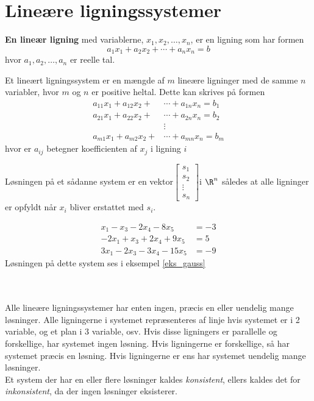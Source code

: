 \section{Lineære ligningssystemer }
%

\textbf{En lineær ligning} med variablerne, $x_1,x_2,\ldots ,x_n$, er en ligning som har formen
$$ a_1x_1+a_2x_2+\cdots+a_nx_n=b$$ 
hvor $a_1,a_2,\ldots,a_n$ er reelle tal. 

\begin{defn}{}{}
Et lineært ligningssystem er en mængde af $m$ lineære ligninger  med de samme $n$ variabler, hvor $m$ og $n$ er positive heltal.
Dette kan skrives på formen
\begin{align*}
a_{11}x_1+a_{12}x_2+&\cdots+a_{1n}x_n=b_1\\
a_{21}x_1+a_{22}x_2+&\cdots+a_{2n}x_n=b_2\\
&\vdots\\
a_{m1}x_1+a_{m2}x_2+&\cdots +a_{mn}x_n=b_m
\end{align*}
hvor er $a_{ij}$ betegner koefficienten af $x_j$ i ligning $i$
\end{defn}
\noindent
Løsningen på et sådanne system er en vektor$\begin{bmatrix}
s_1\\
s_2\\
\vdots\\
s_n
\end{bmatrix}
$i $\R ^n$ således at alle ligninger er opfyldt når $x_i$ bliver erstattet med $s_i$.
\begin{eks}\label{eks}
\begin{align*}
x_1-x_3-2x_4-8x_5&=-3 \\
-2x_1+x_3+2x_4+9x_5&=5 \\
3x_1-2x_3-3x_4-15x_5&=-9
\end{align*}
Løsningen på dette system ses i eksempel \ref{eks_gauss}
\end{eks}
\phantom{g}\\\\
Alle lineære ligningssystemer har enten ingen, præcis en eller uendelig mange løsninger.
Alle ligningerne i systemet repræsenteres af linje hvis systemet er i 2 variable, og et plan i 3 variable, osv. Hvis disse ligningers er parallelle og forskellige, har systemet ingen løsning. Hvis ligningerne er forskellige, så har systemet præcis en løsning. Hvis ligningerne er ens har systemet uendelig mange løsninger.\\
Et system der har en eller flere løsninger kaldes \textit{konsistent}, ellers kaldes det for \textit{inkonsistent}, da der ingen løsninger eksisterer.\\\\
